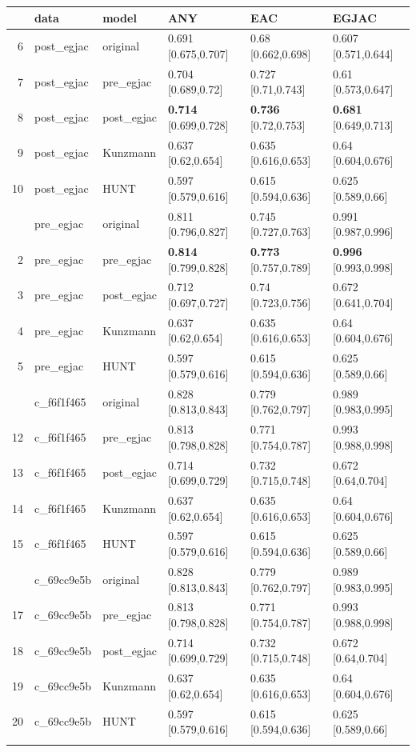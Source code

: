 \documentclass[12pt]{article}
\begin{document}
\begin{table}[ht]
\centering
\begin{tabular}{rlllll}
\toprule
& data & model & ANY & EAC & EGJAC \\
\midrule
  6 & post\_egjac & original & 0.691 [0.675,0.707] & 0.68 [0.662,0.698] & 0.607 [0.571,0.644] \\ 
  7 & post\_egjac & pre\_egjac & 0.704 [0.689,0.72] & 0.727 [0.71,0.743] & 0.61 [0.573,0.647] \\ 
  8 & post\_egjac & post\_egjac & \textbf{0.714} [0.699,0.728] & \textbf{0.736} [0.72,0.753] & \textbf{0.681} [0.649,0.713] \\ 
  9 & post\_egjac & Kunzmann & 0.637 [0.62,0.654] & 0.635 [0.616,0.653] & 0.64 [0.604,0.676] \\ 
  10 & post\_egjac & HUNT & 0.597 [0.579,0.616] & 0.615 [0.594,0.636] & 0.625 [0.589,0.66] \\ \addlinespace
 1 & pre\_egjac & original & 0.811 [0.796,0.827] & 0.745 [0.727,0.763] & 0.991 [0.987,0.996] \\ 
  2 & pre\_egjac & pre\_egjac & \textbf{0.814} [0.799,0.828] & \textbf{0.773} [0.757,0.789] & \textbf{0.996} [0.993,0.998] \\ 
  3 & pre\_egjac & post\_egjac & 0.712 [0.697,0.727] & 0.74 [0.723,0.756] & 0.672 [0.641,0.704] \\ 
  4 & pre\_egjac & Kunzmann & 0.637 [0.62,0.654] & 0.635 [0.616,0.653] & 0.64 [0.604,0.676] \\ 
  5 & pre\_egjac & HUNT & 0.597 [0.579,0.616] & 0.615 [0.594,0.636] & 0.625 [0.589,0.66] \\ \addlinespace
  11 & c\_f6f1f465 & original & 0.828 [0.813,0.843] & 0.779 [0.762,0.797] & 0.989 [0.983,0.995] \\ 
  12 & c\_f6f1f465 & pre\_egjac & 0.813 [0.798,0.828] & 0.771 [0.754,0.787] & 0.993 [0.988,0.998] \\ 
  13 & c\_f6f1f465 & post\_egjac & 0.714 [0.699,0.729] & 0.732 [0.715,0.748] & 0.672 [0.64,0.704] \\ 
  14 & c\_f6f1f465 & Kunzmann & 0.637 [0.62,0.654] & 0.635 [0.616,0.653] & 0.64 [0.604,0.676] \\ 
  15 & c\_f6f1f465 & HUNT & 0.597 [0.579,0.616] & 0.615 [0.594,0.636] & 0.625 [0.589,0.66] \\ \addlinespace
  16 & c\_69cc9e5b & original & 0.828 [0.813,0.843] & 0.779 [0.762,0.797] & 0.989 [0.983,0.995] \\ 
  17 & c\_69cc9e5b & pre\_egjac & 0.813 [0.798,0.828] & 0.771 [0.754,0.787] & 0.993 [0.988,0.998] \\ 
  18 & c\_69cc9e5b & post\_egjac & 0.714 [0.699,0.729] & 0.732 [0.715,0.748] & 0.672 [0.64,0.704] \\ 
  19 & c\_69cc9e5b & Kunzmann & 0.637 [0.62,0.654] & 0.635 [0.616,0.653] & 0.64 [0.604,0.676] \\ 
  20 & c\_69cc9e5b & HUNT & 0.597 [0.579,0.616] & 0.615 [0.594,0.636] & 0.625 [0.589,0.66] \\   \addlinespace
  

\end{tabular}
\end{table}
\end{document}
